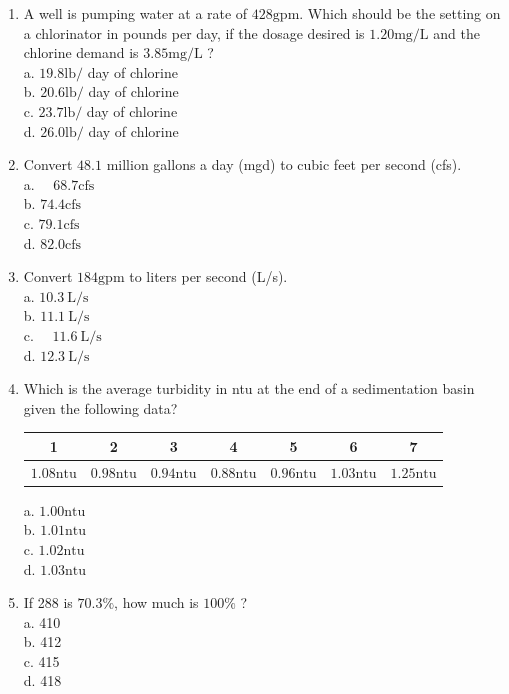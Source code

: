 \documentclass[10pt]{article}
\begin{document}
\begin{enumerate}
  \item A well is pumping water at a rate of $428 \mathrm{gpm}$. Which should be the setting on a chlorinator in pounds per day, if the dosage desired is $1.20 \mathrm{mg} / \mathrm{L}$ and the chlorine demand is $3.85 \mathrm{mg} / \mathrm{L}$ ?\\
a. $19.8 \mathrm{lb} /$ day of chlorine\\
b. $20.6 \mathrm{lb} /$ day of chlorine\\
c. $23.7 \mathrm{lb} /$ day of chlorine\\
d. $26.0 \mathrm{lb} /$ day of chlorine

  \item Convert $48.1$ million gallons a day (mgd) to cubic feet per second (cfs).\\
a. $\quad 68.7 \mathrm{cfs}$\\
b. $74.4 \mathrm{cfs}$\\
c. $79.1 \mathrm{cfs}$\\
d. $82.0 \mathrm{cfs}$

  \item Convert $184 \mathrm{gpm}$ to liters per second (L/s).\\
a. $10.3 \mathrm{~L} / \mathrm{s}$\\
b. $11.1 \mathrm{~L} / \mathrm{s}$\\
c. $\quad 11.6 \mathrm{~L} / \mathrm{s}$\\
d. $12.3 \mathrm{~L} / \mathrm{s}$ 

\item Which is the average turbidity in ntu at the end of a sedimentation basin given the following data?

\begin{tabular}{|c|c|c|c|c|c|c|}
\hline
1 & 2 & 3 & 4 & 5 & 6 & 7 \\
\hline
$1.08 \mathrm{ntu}$ & $0.98 \mathrm{ntu}$ & $0.94 \mathrm{ntu}$ & $0.88 \mathrm{ntu}$ & $0.96 \mathrm{ntu}$ & $1.03 \mathrm{ntu}$ & $1.25 \mathrm{ntu}$ \\
\hline
\end{tabular}

a. $1.00 \mathrm{ntu}$\\
b. $1.01 \mathrm{ntu}$\\
c. $1.02 \mathrm{ntu}$\\
d. $1.03 \mathrm{ntu}$

  \item If 288 is $70.3 \%$, how much is $100 \%$ ?\\
a. 410\\
b. 412\\
c. 415\\
d. 418


\end{enumerate}
\end{document}

